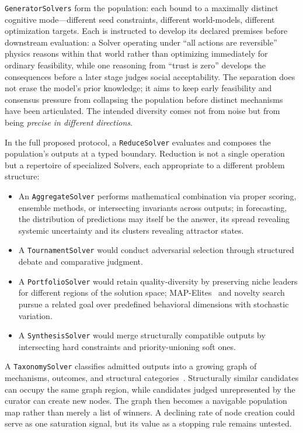 \documentclass[11pt]{article}
\let\oldtexttt\texttt
\renewcommand{\texttt}[1]{\oldtexttt{\small #1}}
\begin{document}
\texttt{GeneratorSolvers} form the population: each bound to a maximally distinct cognitive mode---different seed constraints, different world-models, different optimization targets. Each is instructed to develop its declared premises before downstream evaluation: a Solver operating under ``all actions are reversible'' physics reasons within that world rather than optimizing immediately for ordinary feasibility, while one reasoning from ``trust is zero'' develops the consequences before a later stage judges social acceptability. The separation does not erase the model's prior knowledge; it aims to keep early feasibility and consensus pressure from collapsing the population before distinct mechanisms have been articulated. The intended diversity comes not from noise but from being \emph{precise in different directions}.

In the full proposed protocol, a \texttt{ReduceSolver} evaluates and composes the population's outputs at a typed boundary. Reduction is not a single operation but a repertoire of specialized Solvers, each appropriate to a different problem structure:
\begin{itemize}[leftmargin=1.5em]
\item An \texttt{AggregateSolver} performs mathematical combination via proper scoring, ensemble methods, or intersecting invariants across outputs; in forecasting, the distribution of predictions may itself be the answer, its spread revealing systemic uncertainty and its clusters revealing attractor states.
\item A \texttt{TournamentSolver} would conduct adversarial selection through structured debate and comparative judgment.
\item A \texttt{PortfolioSolver} would retain quality-diversity by preserving niche leaders for different regions of the solution space; MAP-Elites~\cite{mouret2015illuminating} and novelty search~\cite{lehman2011abandoning} pursue a related goal over predefined behavioral dimensions with stochastic variation.
\item A \texttt{SynthesisSolver} would merge structurally compatible outputs by intersecting hard constraints and priority-unioning soft ones.
\end{itemize}

A \texttt{TaxonomySolver} classifies admitted outputs into a growing graph of mechanisms, outcomes, and structural categories~\cite{westerberg2026ontology}. Structurally similar candidates can occupy the same graph region, while candidates judged unrepresented by the curator can create new nodes. The graph then becomes a navigable population map rather than merely a list of winners. A declining rate of node creation could serve as one saturation signal, but its value as a stopping rule remains untested.
\end{document}
